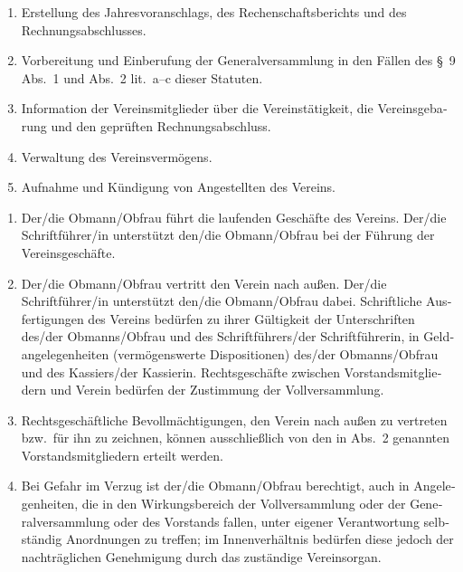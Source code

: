 \begin{otherlanguage}{german}
\begin{enumerate}[statutenenum]
    \item Erstellung des Jahresvoranschlags, des Rechenschaftsberichts und des Rechnungsabschlusses.

    \item Vorbereitung und Einberufung der Generalversammlung in den Fällen des \S\ 9 Abs.\ 1 und Abs.\ 2 lit.\ a--c dieser Statuten.

    \item Information der Vereinsmitglieder über die Vereinstätigkeit, die Vereinsgebarung und den geprüften Rechnungsabschluss.

    \item Verwaltung des Vereinsvermögens.

    \item Aufnahme und Kündigung von Angestellten des Vereins.
\end{enumerate}


\begin{enumerate}[statutenenum]
    \item Der/die Obmann/Obfrau führt die laufenden Geschäfte des Vereins.
        Der/die Schriftführer/in unterstützt den/die Obmann/Obfrau bei der Führung der Vereinsgeschäfte.

    \item Der/die Obmann/Obfrau vertritt den Verein nach außen.
        Der/die Schriftführer/in unterstützt den/die Obmann/Obfrau dabei.
        Schriftliche Ausfertigungen des Vereins bedürfen zu ihrer Gültigkeit der Unterschriften des/der Obmanns/Obfrau und des Schriftführers/der Schriftführerin, in Geldangelegenheiten (vermögenswerte Dispositionen) des/der Obmanns/Obfrau und des Kassiers/der Kassierin.
        Rechtsgeschäfte zwischen Vorstandsmitgliedern und Verein bedürfen der Zustimmung der Vollversammlung.

    \item Rechtsgeschäftliche Bevollmächtigungen, den Verein nach außen zu vertreten bzw.\ für ihn zu zeichnen, können ausschließlich von den in Abs.\ 2 genannten Vorstandsmitgliedern erteilt werden.

    \item Bei Gefahr im Verzug ist der/die Obmann/Obfrau berechtigt, auch in Angelegenheiten, die in den Wirkungsbereich der Vollversammlung oder der Generalversammlung oder des Vorstands fallen, unter eigener Verantwortung selbständig Anordnungen zu treffen;
        im Innenverhältnis bedürfen diese jedoch der nachträglichen Genehmigung durch das zuständige Vereinsorgan.


\end{enumerate}
\end{otherlanguage}
